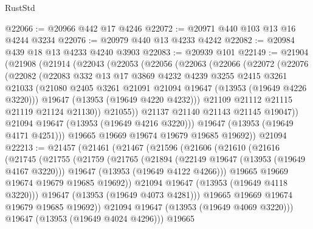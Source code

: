 \begin{lexlean}{RustStd}
\begin{coremodule}
@22066 := @20966 @442 @17 @4246
@22072 := @20971 @440 @103 @13 @16 @4244 @3234
@22076 := @20979 @440 @13 @4233 @4242
@22082 := @20984 @439 @18 @13 @4233 @4240 @3903
@22083 := @20939 @101
@22149 := @21904
    (@21908
      (@21914
        (@22043
          (@22053
            (@22056
              (@22063
                (@22066
                  (@22072
                    (@22076
                      (@22082
                        (@22083
                          @332
                          @13
                          @17
                          @3869
                          @4232
                          @4239
                          @3255
                          @2415
                          @3261
                          @21033
                          (@21080 @2405 @3261 @21091 @21094 @19647 (@13953 (@19649 @4226 @3220)))
                          @19647
                          (@13953 (@19649 @4220 @4232)))
                        @21109
                        @21112
                        @21115
                        @21119
                        @21124
                        @21130))
                    @21055))
                @21137
                @21140
                @21143
                @21145
                @19047))
            @21094
            @19647
            (@13953 (@19649 @4216 @3220)))
          @19647
          (@13953 (@19649 @4171 @4251)))
        @19665
        @19669
        @19674
        @19679
        @19685
        @19692))
    @21094
@22213 := @21457
    (@21461
      (@21467
        (@21596
          (@21606
            (@21610
              (@21616
                (@21745
                  (@21755
                    (@21759
                      (@21765
                        (@21894
                          (@22149 @19647 (@13953 (@19649 @4167 @3220)))
                          @19647
                          (@13953 (@19649 @4122 @4266)))
                        @19665
                        @19669
                        @19674
                        @19679
                        @19685
                        @19692))
                    @21094
                    @19647
                    (@13953 (@19649 @4118 @3220)))
                  @19647
                  (@13953 (@19649 @4073 @4281)))
                @19665
                @19669
                @19674
                @19679
                @19685
                @19692))
            @21094
            @19647
            (@13953 (@19649 @4069 @3220)))
          @19647
          (@13953 (@19649 @4024 @4296)))
        @19665

\end{coremodule}
\end{lexlean}
